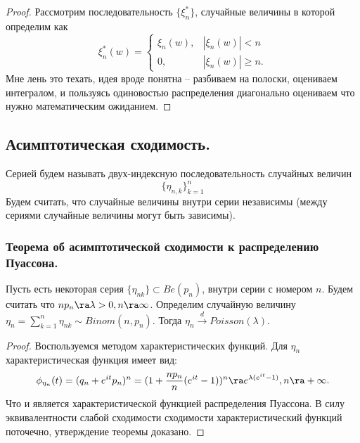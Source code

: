 \begin{proof}
    Рассмотрим последовательность $\{\xi_n^*\}$, случайные величины в которой определим как
    \[
        \xi_n^*(w) =
        \begin{cases}
            \xi_n(w), & |\xi_n(w)| < n \\
            0, & |\xi_n(w)| \geq n.
        \end{cases}
    \]
    Мне лень это техать, идея вроде понятна -- разбиваем на полоски, оцениваем интегралом, и пользуясь одиновостью распределения диагонально оцениваем что нужно математическим ожиданием.
\end{proof}
\subsection{Асимптотическая сходимость.}
\begin{definition}
    Серией будем называть двух-индексную последовательность случайных величин
    \[
        \{\eta_{n, k}\}_{k = 1}^{n}
    \]
    Будем считать, что случайные величины внутри серии независимы (между сериями случайные величины могут быть зависимы).
\end{definition}
\subsubsection{Теорема об асимптотической сходимости к распределению Пуассона.}
\begin{theorem}[Пуассон]
    Пусть есть некоторая серия $\{\eta_{nk}\} \subset Be(p_n)$, внутри серии с номером $n$.
    Будем считать что $np_n \ra \lambda > 0, n \ra \infty$.
    Определим случайную величину $\eta_n = \sum\limits_{k = 1}^{n} \eta_{nk} \sim Binom(n, p_n)$.
    Тогда $\eta_n \xrightarrow{d} Poisson(\lambda)$.
\end{theorem}
\begin{proof}
    Воспользуемся методом характеристических функций.
    Для $\eta_n$ характеристическая функция имеет вид:
    \[
        \phi_{\eta_n}(t) = (q_n + e^{it}p_n)^n = (1 + \frac{n p_n}{n}(e^{it} - 1))^n \ra e^{\lambda(e^{it} - 1)}, n \ra +\infty.
    \]
    Что и является характеристической функцией распределения Пуассона.
    В силу эквивалентности слабой сходимости сходимости характеристический функций поточечно, утверждение теоремы доказано.
\end{proof}
